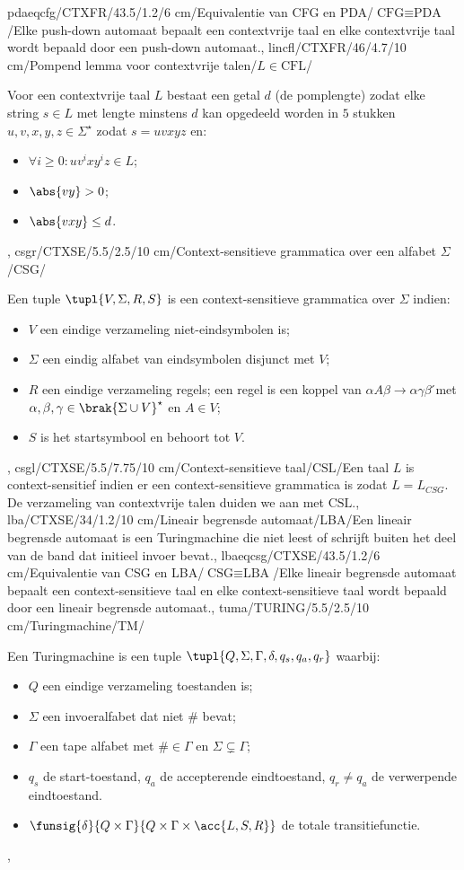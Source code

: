 pdaeqcfg/CTXFR/43.5/1.2/6 cm/Equivalentie van CFG en PDA/$\mbox{CFG}\equiv\mbox{PDA}$/{Elke push-down automaat bepaalt een contextvrije taal en elke contextvrije taal wordt bepaald door een push-down automaat.},
lincfl/CTXFR/46/4.7/10 cm/Pompend lemma voor contextvrije talen/$L\in\mbox{CFL}$/{Voor een contextvrije taal $L$ bestaat een getal $d$ (de pomplengte) zodat elke string $s\in L$ met lengte minstens $d$ kan opgedeeld worden in $5$ stukken $u,v,x,y,z\in\Sigma^{\star}$ zodat $s=uvxyz$ en:\begin{itemize}\item $\forall i\geq 0:uv^ixy^iz\in L$;\item $\abs{vy}>0$;\item $\abs{vxy}\leq d$.\end{itemize}},
csgr/CTXSE/5.5/2.5/10 cm/Context-sensitieve grammatica over een alfabet $\Sigma$/CSG/{Een tuple $\tupl{V,\Sigma,R,S}$ is een context-sensitieve grammatica over $\Sigma$ indien:\begin{itemize}
 \item $V$ een eindige verzameling niet-eindsymbolen is;
 \item $\Sigma$ een eindig alfabet van eindsymbolen disjunct met $V$;
 \item $R$ een eindige verzameling regels; een regel is een koppel van $\alpha A\beta\rightarrow\alpha\gamma\beta$ ́met $\alpha,\beta,\gamma\in\brak{\Sigma\cup V}^{\star}$ en $A\in V$;
 \item $S$ is het startsymbool en behoort tot $V$.
\end{itemize}},
csgl/CTXSE/5.5/7.75/10 cm/Context-sensitieve taal/$\mbox{CSL}$/{Een taal $L$ is context-sensitief indien er een context-sensitieve grammatica is zodat $L=L_{CSG}$. De verzameling van contextvrije talen duiden we aan met $\mbox{CSL}$.},
lba/CTXSE/34/1.2/10 cm/Lineair begrensde automaat/LBA/{Een lineair begrensde automaat is een Turingmachine die niet leest of schrijft buiten het deel van de band dat initieel invoer bevat.},
lbaeqcsg/CTXSE/43.5/1.2/6 cm/Equivalentie van CSG en LBA/$\mbox{CSG}\equiv\mbox{LBA}$/{Elke lineair begrensde automaat bepaalt een context-sensitieve taal en elke context-sensitieve taal wordt bepaald door een lineair begrensde automaat.},
tuma/TURING/5.5/2.5/10 cm/Turingmachine/TM/{Een Turingmachine is een tuple $\tupl{Q,\Sigma,\Gamma,\delta,q_s,q_a,q_r}$ waarbij:\begin{itemize}
 \item $Q$ een eindige verzameling toestanden is;
 \item $\Sigma$ een invoeralfabet dat niet $\#$ bevat;
 \item $\Gamma$ een tape alfabet met $\#\in\Gamma$ en $\Sigma\subsetneq\Gamma$;
 \item $q_s$ de start-toestand, $q_a$ de accepterende eindtoestand, $q_r\neq q_a$ de verwerpende eindtoestand.
 \item $\funsig{\delta}{Q\times\Gamma}{Q\times\Gamma\times\acc{L,S,R}}$ de totale transitiefunctie.
\end{itemize}},
